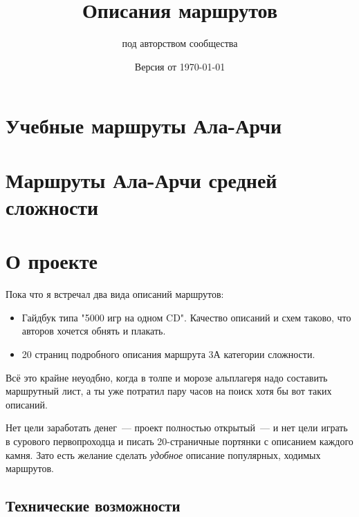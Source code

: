\documentclass[11pt,fleqn]{report} %
\title{Описания маршрутов}
\date{Версия от \today}
\author{под авторством сообщества}
\begin{document}
\tableofcontents

\chapter{Учебные маршруты Ала-Арчи}

\routeListEasyAlaArcha

\chapter{Маршруты Ала-Арчи средней сложности}

\routeListMiddleAlaArcha

\chapter{О проекте}

\newcommand{\gitRepo}[0]{\href{https://github.com/johnlepikhin/alpine-guidebook}{GitHub}}

Пока что я встречал два вида описаний маршрутов:
\begin{itemize}
\item Гайдбук типа "5000 игр на одном CD". Качество описаний и схем
  таково, что авторов хочется обнять и плакать.
\item 20 страниц подробного описания маршрута 3А категории сложности.
\end{itemize}

Всё это крайне неуодбно, когда в толпе и морозе альплагеря надо
составить маршрутный лист, а ты уже потратил пару часов на поиск хотя
бы вот таких описаний.

Нет цели заработать денег~--- проект полностью открытый~--- и нет цели
играть в сурового первопроходца и писать 20-страничные портянки с
описанием каждого камня. Зато есть желание сделать \textit{удобное}
описание популярных, ходимых маршрутов.

\section{Технические возможности}
\end{document}
